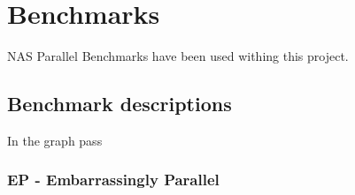 \chapter{Benchmarks}

NAS Parallel Benchmarks have been used withing this project.

\section{Benchmark descriptions} 
In the graph pass

\subsection{EP - Embarrassingly Parallel}


